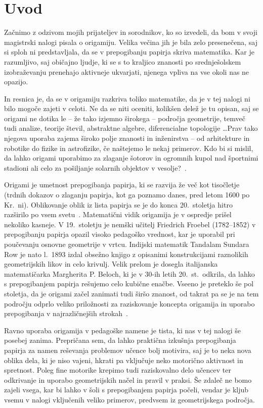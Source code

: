 \section{Uvod}

Začnimo z odzivom mojih prijateljev in sorodnikov, ko so izvedeli, da bom v svoji magistrski nalogi pisala o origamiju. Velika večina jih je bila zelo presenečena, saj si sploh ni predstavljala, da se v prepogibanju papirja skriva matematika. Kar je razumljivo, saj običajno ljudje, ki se s to kraljico znanosti po srednješolskem izobraževanju prenehajo aktivneje ukvarjati, njenega vpliva na vse okoli nas ne opazijo.

In resnica je, da se v origamiju razkriva toliko matematike, da je v tej nalogi ni bilo mogoče zajeti v celoti. Ne da se niti oceniti, kolikšen delež je tu opisan, saj se origami ne dotika le -- že tako izjemno širokega -- področja geometrije, temveč tudi analize, teorije števil, abstraktne algebre, diferencialne topologije \ldots Prav tako njegova uporaba zajema široko polje znanosti in inženirstva -- od arhitekture in robotike do fizike in astrofizike, če naštejemo le nekaj primerov. Kdo bi si mislil, da lahko origami uporabimo za zlaganje šotorov in ogromnih kupol nad športnimi stadioni ali celo za pošiljanje solarnih objektov v vesolje?~\cite[str.\ 3--5]{hull2020}.

Origami je umetnost prepogibanja papirja, ki se razvija že več kot tisočletje (trdnih dokazov o zlaganju papirja, kot ga poznamo danes, pred letom 1600 po Kr.\ ni). Oblikovanje oblik iz lista papirja se je do konca 20.\ stoletja hitro razširilo po vsem svetu~\cite{robinson2024}. Matematični vidik origamija je v ospredje prišel nekoliko kasneje. V 19.\ stoletju je nemški učitelj Friedrich Froebel (1782--1852) v prepogibanju papirja opazil visoko pedagoško vrednost, kar je uporabil pri poučevanju osnovne geometrije v vrtcu. Indijski matematik Tandalam Sundara Row je nato l.\ 1893 izdal obsežno knjigo z opisanimi konstrukcijami raznolikih geometrijskih likov in celo krivulj. Velik prelom je dosegla italijanska matematičarka Margherita P. Beloch, ki je v 30-ih letih 20.\ st.\ odkrila, da lahko s prepogibanjem papirja rešujemo celo kubične enačbe. Vseeno je preteklo še pol stoletja, da je origami začel zanimati tudi širšo znanost, od takrat pa se je na tem področju odprlo veliko priložnosti za raziskovanje koncepta origamija in uporabo prepogibanja v najrazličnejših strokah~\cite[str.\ 10]{hull2020}.

Ravno uporaba origamija v pedagoške namene je tista, ki nas v tej nalogi še posebej zanima. Prepričana sem, da lahko praktična izkušnja prepogibanja papirja za namen reševanja problemov učence bolj motivira, saj je to neka nova oblika dela, ki je niso vajeni, hkrati pa vključuje neko motorično aktivnost in spretnost. Poleg fine motorike krepimo tudi raziskovalno delo učencev ter odkrivanje in uporabo geometrijskih načel in pravil v praksi. Še zdaleč ne bomo zajeli vsega, kar bi lahko v šoli s prepogibanjem papirja počeli, vendar je kljub vsemu v nalogi vključenih veliko primerov, predvsem iz geometrijskega področja.


